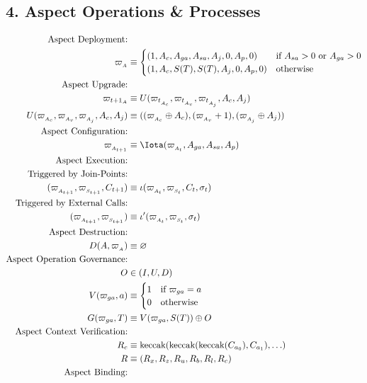 \subsection*{4. Aspect Operations \& Processes}
\begin{align*}
\text{Aspect Deployment:} & \\
\varpi_{_A} & \equiv
\begin{cases}
(1, A_c, A_{ga}, A_{sa}, A_j, 0, A_p, 0) & \text{if } A_{sa} > 0 \text{ or } A_{ga} > 0 \\
(1, A_c, S(T), S(T), A_j, 0, A_p, 0) & \text{otherwise}
\end{cases} \\
\text{Aspect Upgrade:} & \\
\varpi_{{t+1}_A} & \equiv U(\varpi_{t_{_{A_c}}}, \varpi_{t_{_{A_v}}}, \varpi_{t_{_{A_j}}}, A_c, A_j) \\
U(\varpi_{_{A_c}}, \varpi_{_{A_v}}, \varpi_{_{A_j}}, A_c, A_j) & \equiv ((\varpi_{_{A_c}} \oplus A_c), (\varpi_{_{A_v}} + 1), (\varpi_{_{A_j}} \oplus A_j)) \\
\text{Aspect Configuration:} & \\
\varpi_{_{A_{t+1}}} & \equiv \Iota(\varpi_{_{A_t}}, A_{ga}, A_{sa}, A_p) \\
\text{Aspect Execution:} & \\
\text{Triggered by Join-Points:} & \\
(\varpi_{_{A_{t+1}}}, \varpi_{_{S_{t+1}}}, C_{t+1}) & \equiv \iota(\varpi_{_{A_{t}}}, \varpi_{_{S_{t}}}, C_{t}, \sigma_t) \\
\text{Triggered by External Calls:} & \\
(\varpi_{_{A_{t+1}}}, \varpi_{_{S_{t+1}}}) & \equiv \iota'(\varpi_{_{A_{t}}}, \varpi_{_{S_{t}}}, \sigma_{t}) \\
\text{Aspect Destruction:} & \\
D(A, \varpi_{_A}) & \equiv \varnothing \\
\text{Aspect Operation Governance:} & \\
O & \in (I, U, D) \\
V(\varpi_{ga}, a) & \equiv
\begin{cases}
1 & \text{if } \varpi_{ga} = a \\
0 & \text{otherwise}
\end{cases} \\
G(\varpi_{ga}, T) & \equiv V(\varpi_{ga}, S(T)) \oplus O \\
\text{Aspect Context Verification:} & \\
R_c & \equiv \text{keccak}(\text{keccak}(\text{keccak}(C_{a_0}), C_{a_1}), \ldots) \\
R & \equiv (R_x, R_z, R_u, R_b, R_l, R_c) \\
\text{Aspect Binding:} & \\
\end{align*}
